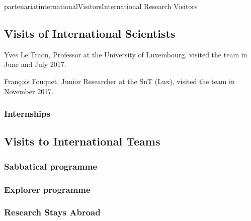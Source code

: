 \documentclass{ra2018}
\begin{document}
\begin{module}{partenariat}{internationalVisitors}{International Research Visitors}

\subsection{Visits of International Scientists}

Yves Le Traon, Professor at the University of Luxembourg, visited the team in June and July 2017.

François Fouquet, Junior Researcher at the SnT (Lux), visited the team in November 2017.

   \subsubsection{Internships}




\subsection{Visits to International Teams}
   \subsubsection{Sabbatical programme}




   \subsubsection{Explorer programme}




   \subsubsection{Research Stays Abroad}
   
   






\end{module}
\end{document}
